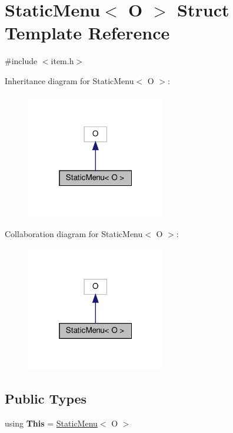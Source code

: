 \hypertarget{structStaticMenu_3_01O_01_4}{}\section{Static\+Menu$<$ O $>$ Struct Template Reference}
\label{structStaticMenu_3_01O_01_4}


{\ttfamily \#include $<$item.\+h$>$}



Inheritance diagram for Static\+Menu$<$ O $>$\+:\nopagebreak
\begin{figure}[H]
\begin{center}
\leavevmode
\includegraphics[width=172pt]{structStaticMenu_3_01O_01_4__inherit__graph}
\end{center}
\end{figure}


Collaboration diagram for Static\+Menu$<$ O $>$\+:\nopagebreak
\begin{figure}[H]
\begin{center}
\leavevmode
\includegraphics[width=172pt]{structStaticMenu_3_01O_01_4__coll__graph}
\end{center}
\end{figure}
\subsection*{Public Types}
\begin{DoxyCompactItemize}
\item 
\mbox{\label{structStaticMenu_3_01O_01_4_a2af1d1c51d0fa0884e3d9c7d9cb5286b}} 
using {\bfseries This} = \hyperlink{classStaticMenu}{Static\+Menu}$<$ O $>$
\end{DoxyCompactItemize}
